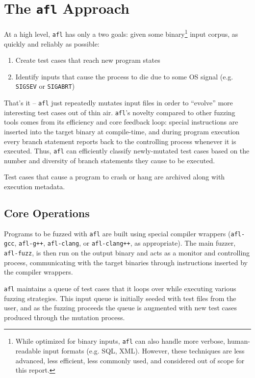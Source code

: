 \chapter{The \texttt{afl} Approach}
\label{sec:3}

At a high level, \texttt{afl} has only a two goals: given some binary\footnote{While optimized for binary inputs, \texttt{afl} can also handle more verbose, human-readable input formats (e.g. SQL, XML). However, these techniques are less advanced, less efficient, less commonly used, and considered out of scope for this report.}
input corpus, as quickly and reliably as possible:

\begin{enumerate}
    \item Create test cases that reach new program states
    \item Identify inputs that cause the process to die due to some
    OS signal (e.g. \texttt{SIGSEV} or \texttt{SIGABRT})
\end{enumerate}

That's it -- \texttt{afl} just repeatedly mutates input files in order to
``evolve'' more interesting test cases out of thin air.
\texttt{afl}'s novelty compared to other fuzzing tools comes from its
efficiency and core feedback loop: special instructions are inserted into the
target binary at compile-time, and during program execution every branch
statement reports back to the controlling process whenever it is executed.
Thus, \texttt{afl} can efficiently classify newly-mutated test cases based on
the number and diversity of branch statements they cause to be executed.

Test cases that cause a program to crash or hang are archived along with
execution metadata.

\section{Core Operations}

Programs to be fuzzed with \texttt{afl} are built using special compiler
wrappers (\texttt{afl-gcc}, \texttt{afl-g++}, \texttt{afl-clang}, or
\texttt{afl-clang++}, as appropriate). The main fuzzer, \texttt{afl-fuzz},
is then run on the output binary and acts as a monitor and controlling
process, communicating with the target binaries through instructions
inserted by the compiler wrappers.

\texttt{afl} maintains a queue of test cases that it loops over while
executing various fuzzing strategies. This input queue is initially seeded
with test files from the user, and as the fuzzing proceeds the queue is
augmented with new test cases produced through the mutation process.

